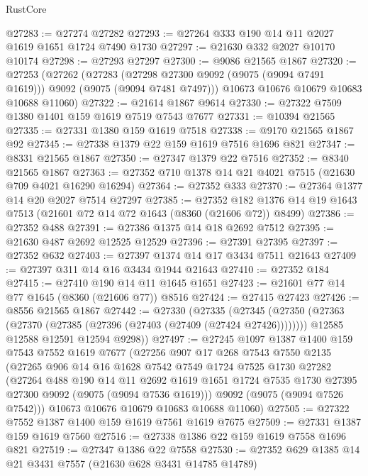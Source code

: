 \begin{lexlean}{RustCore}
\begin{coremodule}
@27283 := @27274 @27282
@27293 := @27264 @333 @190 @14 @11 @2027 @1619 @1651 @1724 @7490 @1730
@27297 := @21630 @332 @2027 @10170 @10174
@27298 := @27293 @27297
@27300 := @9086 @21565 @1867
@27320 := @27253
    (@27262
      (@27283 (@27298 @27300 @9092 (@9075 (@9094 @7491 @1619))) @9092 (@9075 (@9094 @7481 @7497)))
      @10673
      @10676
      @10679
      @10683
      @10688
      @11060)
@27322 := @21614 @1867 @9614
@27330 := @27322 @7509 @1380 @1401 @159 @1619 @7519 @7543 @7677
@27331 := @10394 @21565
@27335 := @27331 @1380 @159 @1619 @7518
@27338 := @9170 @21565 @1867 @92
@27345 := @27338 @1379 @22 @159 @1619 @7516 @1696 @821
@27347 := @8331 @21565 @1867
@27350 := @27347 @1379 @22 @7516
@27352 := @8340 @21565 @1867
@27363 := @27352 @710 @1378 @14 @21 @4021 @7515 (@21630 @709 @4021 @16290 @16294)
@27364 := @27352 @333
@27370 := @27364 @1377 @14 @20 @2027 @7514 @27297
@27385 := @27352
    @182
    @1376
    @14
    @19
    @1643
    @7513
    (@21601 @72 @14 @72 @1643 (@8360 (@21606 @72)) @8499)
@27386 := @27352 @488
@27391 := @27386 @1375 @14 @18 @2692 @7512
@27395 := @21630 @487 @2692 @12525 @12529
@27396 := @27391 @27395
@27397 := @27352 @632
@27403 := @27397 @1374 @14 @17 @3434 @7511 @21643
@27409 := @27397 @311 @14 @16 @3434 @1944 @21643
@27410 := @27352 @184
@27415 := @27410 @190 @14 @11 @1645 @1651
@27423 := @21601 @77 @14 @77 @1645 (@8360 (@21606 @77)) @8516
@27424 := @27415 @27423
@27426 := @8556 @21565 @1867
@27442 := @27330
    (@27335
      (@27345
        (@27350 (@27363 (@27370 (@27385 (@27396 (@27403 (@27409 (@27424 @27426))))))))
        @12585
        @12588
        @12591
        @12594
        @9298))
@27497 := @27245
    @1097
    @1387
    @1400
    @159
    @7543
    @7552
    @1619
    @7677
    (@27256
      @907
      @17
      @268
      @7543
      @7550
      @2135
      (@27265
        @906
        @14
        @16
        @1628
        @7542
        @7549
        @1724
        @7525
        @1730
        @27282
        (@27264
          @488
          @190
          @14
          @11
          @2692
          @1619
          @1651
          @1724
          @7535
          @1730
          @27395
          @27300
          @9092
          (@9075 (@9094 @7536 @1619)))
        @9092
        (@9075 (@9094 @7526 @7542)))
      @10673
      @10676
      @10679
      @10683
      @10688
      @11060)
@27505 := @27322 @7552 @1387 @1400 @159 @1619 @7561 @1619 @7675
@27509 := @27331 @1387 @159 @1619 @7560
@27516 := @27338 @1386 @22 @159 @1619 @7558 @1696 @821
@27519 := @27347 @1386 @22 @7558
@27530 := @27352 @629 @1385 @14 @21 @3431 @7557 (@21630 @628 @3431 @14785 @14789)

\end{coremodule}
\end{lexlean}
